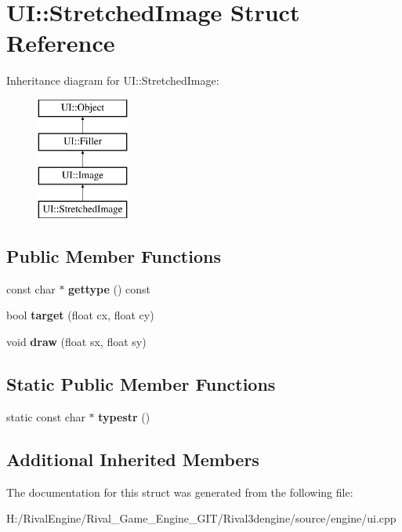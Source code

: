 \hypertarget{struct_u_i_1_1_stretched_image}{}\section{UI\+:\+:Stretched\+Image Struct Reference}
\label{struct_u_i_1_1_stretched_image}
Inheritance diagram for UI\+:\+:Stretched\+Image\+:\begin{figure}[H]
\begin{center}
\leavevmode
\includegraphics[height=4.000000cm]{struct_u_i_1_1_stretched_image}
\end{center}
\end{figure}
\subsection*{Public Member Functions}
\begin{DoxyCompactItemize}
\item 
\mbox{\label{struct_u_i_1_1_stretched_image_a057b7989fbca7789191399686a5ad3ce}} 
const char $\ast$ {\bfseries gettype} () const
\item 
\mbox{\label{struct_u_i_1_1_stretched_image_ac4166702986fca2aeca3bec7017fe7bc}} 
bool {\bfseries target} (float cx, float cy)
\item 
\mbox{\label{struct_u_i_1_1_stretched_image_a6bd1f0bda3bac0ad9ceb4e0be1753a87}} 
void {\bfseries draw} (float sx, float sy)
\end{DoxyCompactItemize}
\subsection*{Static Public Member Functions}
\begin{DoxyCompactItemize}
\item 
\mbox{\label{struct_u_i_1_1_stretched_image_afaed6e80f339c8ba86d28599c3fbaef8}} 
static const char $\ast$ {\bfseries typestr} ()
\end{DoxyCompactItemize}
\subsection*{Additional Inherited Members}


The documentation for this struct was generated from the following file\+:\begin{DoxyCompactItemize}
\item 
H\+:/\+Rival\+Engine/\+Rival\+\_\+\+Game\+\_\+\+Engine\+\_\+\+G\+I\+T/\+Rival3dengine/source/engine/ui.\+cpp\end{DoxyCompactItemize}
